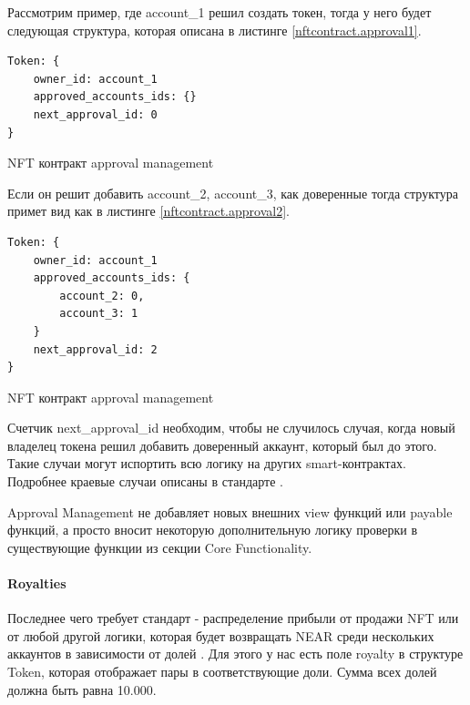 Рассмотрим пример, где account\_1 решил создать токен, тогда у него будет следующая структура, которая описана в листинге {\color{blue}\ref{nftcontract.approval1}}.
\begin{listing}
\begin{verbatim}
Token: {
    owner_id: account_1
    approved_accounts_ids: {}
    next_approval_id: 0
}
\end{verbatim}
\caption{NFT контракт approval management}
\label{nftcontract.approval1}
\end{listing}

Если он решит добавить account\_2, account\_3, как доверенные тогда структура примет вид как в листинге {\color{blue}\ref{nftcontract.approval2}}.
\begin{listing}
\begin{verbatim}
Token: {
    owner_id: account_1
    approved_accounts_ids: {
        account_2: 0,
        account_3: 1
    }
    next_approval_id: 2
}
\end{verbatim}
\caption{NFT контракт approval management}
\label{nftcontract.approval2}
\end{listing}

Счетчик next\_approval\_id  необходим, чтобы не случилось случая, когда новый владелец токена решил добавить доверенный аккаунт, который был до этого. Такие случаи могут испортить всю логику на других smart-контрактах.
Подробнее краевые случаи описаны в стандарте \cite{approvalstandard}.

Approval Management не добавляет новых внешних view функций или payable функций, а просто вносит некоторую дополнительную логику проверки в существующие функции из секции Core Functionality.

\paragraph{Royalties}
\label{section.main.smart.struct.royalties}

Последнее чего требует стандарт - распределение прибыли от продажи NFT или от любой другой логики, которая будет возвращать NEAR среди нескольких аккаунтов в зависимости от долей \cite{royaltystandard}.
Для этого у нас есть поле royalty в структуре Token, которая отображает пары в соответствующие доли. Сумма всех долей должна быть равна 10.000.


